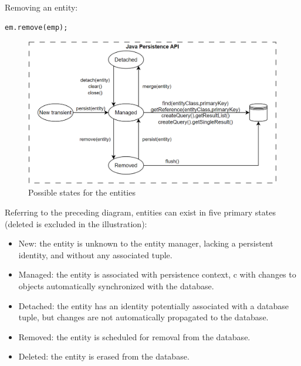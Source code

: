 \begin{example}
    Removing an entity:
    \begin{lstlisting}[style=Java]
em.remove(emp);
    \end{lstlisting}
\end{example}
\begin{figure}[H]
    \centering
    \includegraphics[width=0.75\linewidth]{images/jpaem.png}
    \caption{Possible states for the entities}
\end{figure}
Referring to the preceding diagram, entities can exist in five primary states (deleted is excluded in the illustration):
\begin{itemize}
    \item New: the entity is unknown to the entity manager, lacking a persistent identity, and without any associated tuple.
    \item Managed: the entity is associated with persistence context, c with changes to objects automatically synchronized with the database.
    \item Detached: the entity has an identity potentially associated with a database tuple, but changes are not automatically propagated to the database.
    \item Removed: the entity is scheduled for removal from the database.
    \item Deleted: the entity is erased from the database. 
\end{itemize}

